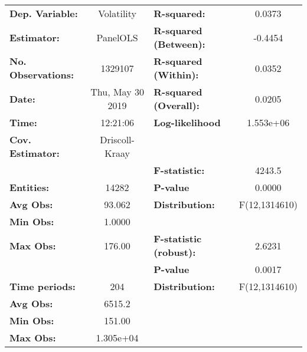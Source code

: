 \begin{center}
\begin{tabular}{lclc}
\toprule
\textbf{Dep. Variable:}                 &     Volatility     & \textbf{  R-squared:         }   &      0.0373      \\
\textbf{Estimator:}                     &      PanelOLS      & \textbf{  R-squared (Between):}  &     -0.4454      \\
\textbf{No. Observations:}              &      1329107       & \textbf{  R-squared (Within):}   &      0.0352      \\
\textbf{Date:}                          &  Thu, May 30 2019  & \textbf{  R-squared (Overall):}  &      0.0205      \\
\textbf{Time:}                          &      12:21:06      & \textbf{  Log-likelihood     }   &    1.553e+06     \\
\textbf{Cov. Estimator:}                &   Driscoll-Kraay   & \textbf{                     }   &                  \\
\textbf{}                               &                    & \textbf{  F-statistic:       }   &      4243.5      \\
\textbf{Entities:}                      &       14282        & \textbf{  P-value            }   &      0.0000      \\
\textbf{Avg Obs:}                       &       93.062       & \textbf{  Distribution:      }   &  F(12,1314610)   \\
\textbf{Min Obs:}                       &       1.0000       & \textbf{                     }   &                  \\
\textbf{Max Obs:}                       &       176.00       & \textbf{  F-statistic (robust):} &      2.6231      \\
\textbf{}                               &                    & \textbf{  P-value            }   &      0.0017      \\
\textbf{Time periods:}                  &        204         & \textbf{  Distribution:      }   &  F(12,1314610)   \\
\textbf{Avg Obs:}                       &       6515.2       & \textbf{                     }   &                  \\
\textbf{Min Obs:}                       &       151.00       & \textbf{                     }   &                  \\
\textbf{Max Obs:}                       &     1.305e+04      & \textbf{                     }   &                  \\

\end{tabular}
\end{center}
